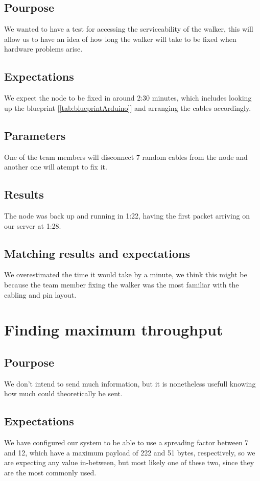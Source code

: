 	\subsection{Pourpose}
		We wanted to have a test for accessing the serviceability of the walker, this will allow us to have an idea of how long the walker will take to be fixed when hardware problems arise.
	\subsection{Expectations}
		We expect the node to be fixed in around 2:30 minutes, which includes looking up the blueprint [\ref{tab:blueprintArduino}] and arranging the cables accordingly.
	\subsection{Parameters}
		One of the team members will disconnect 7 random cables from the node and another one will atempt to fix it.
	\subsection{Results}
		The node was back up and running in 1:22, having the first packet arriving on our server at 1:28.
	\subsection{Matching results and expectations}
		We overestimated the time it would take by a minute, we think this might be because the team member fixing the walker was the most familiar with the cabling and pin layout.

\section{Finding maximum throughput}

	\subsection{Pourpose}
		We don't intend to send much information, but it is nonetheless usefull knowing how much could theoretically be sent.
	\subsection{Expectations}
		We have configured our system to be able to use a spreading factor between 7 and 12, which have a maximum payload of 222 and 51 bytes, respectively, so we are expecting any value in-between, but most likely one of these two, since they are the most commonly used.
